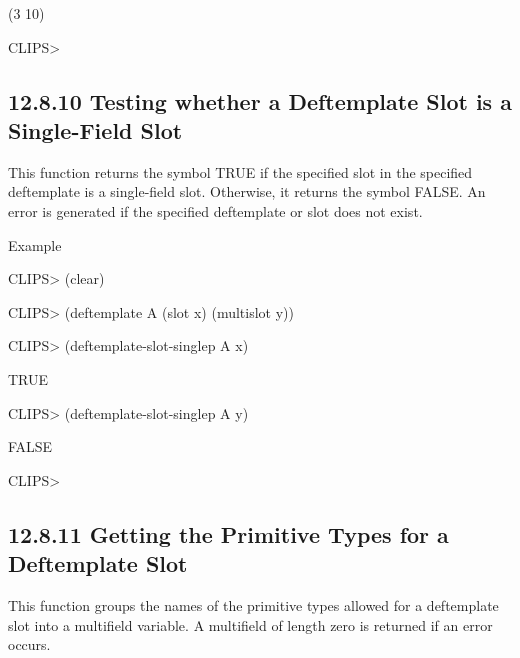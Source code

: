 \documentclass[letterpaper,10pt,english]{sphinxmanual}
\begin{document}
(3 10)

CLIPS\textgreater{}


\subsection{12.8.10 Testing whether a Deftemplate Slot is a Single-Field Slot}
\label{\detokenize{actions:testing-whether-a-deftemplate-slot-is-a-single-field-slot}}
This function returns the symbol TRUE if the specified slot in the
specified deftemplate is a single-field slot. Otherwise, it returns the
symbol FALSE. An error is generated if the specified deftemplate or slot
does not exist.


\begin{sphinxVerbatim}[commandchars=\\\{\}]
  
\end{sphinxVerbatim}

Example

CLIPS\textgreater{} (clear)

CLIPS\textgreater{} (deftemplate A (slot x) (multislot y))

CLIPS\textgreater{} (deftemplate-slot-singlep A x)

TRUE

CLIPS\textgreater{} (deftemplate-slot-singlep A y)

FALSE

CLIPS\textgreater{}


\subsection{12.8.11 Getting the Primitive Types for a Deftemplate Slot}
\label{\detokenize{actions:getting-the-primitive-types-for-a-deftemplate-slot}}
This function groups the names of the primitive types allowed for a
deftemplate slot into a multifield variable. A multifield of length zero
is returned if an error occurs.


\begin{sphinxVerbatim}[commandchars=\\\{\}]
  
\end{sphinxVerbatim}
\end{document}
